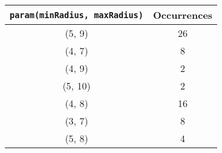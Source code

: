 \documentclass[letterpaper, 12pt]{article}
\begin{document}
\begin{longtable}{|c|c|}
\hline
\textbf{\texttt{param(minRadius, maxRadius)}} & \textbf{Occurrences} \\
\hline
(5, 9) & 26 \\
\hline
(4, 7) & 8 \\
\hline
(4, 9) & 2 \\
\hline
(5, 10) & 2 \\
\hline
(4, 8) & 16 \\
\hline
(3, 7) & 8 \\
\hline
(5, 8) & 4 \\
\hline
\end{longtable}
\end{document}
